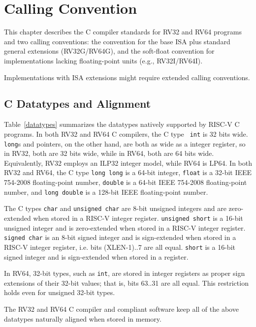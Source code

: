 \chapter{Calling Convention}
\label{sec:calling}

This chapter describes the C compiler standards for RV32 and RV64 programs
and two calling conventions: the convention for the base ISA
plus standard general extensions (RV32G/RV64G), and the soft-float
convention for implementations lacking floating-point units (e.g., RV32I/RV64I).

\begin{commentary}
Implementations with ISA extensions might require extended calling
conventions.
\end{commentary}

\section{C Datatypes and Alignment}

Table~\ref{datatypes} summarizes the datatypes natively supported by
RISC-V C programs.  In both RV32 and RV64 C compilers, the C type {\tt
  int} is 32 bits wide.  {\tt long}s and pointers, on the other hand,
are both as wide as a integer register, so in RV32, both are 32 bits
wide, while in RV64, both are 64 bits wide.  Equivalently, RV32
employs an ILP32 integer model, while RV64 is LP64.  In both RV32 and
RV64, the C type {\tt long long} is a 64-bit integer, {\tt float} is a
32-bit IEEE 754-2008 floating-point number, {\tt double} is a 64-bit
IEEE 754-2008 floating-point number, and {\tt long double} is a
128-bit IEEE floating-point number.

The C types {\tt char} and {\tt unsigned char} are 8-bit unsigned integers and
are zero-extended when stored in a RISC-V integer register. {\tt unsigned
short} is a 16-bit unsigned integer and is zero-extended when stored in
a RISC-V integer register.  {\tt signed char} is an 8-bit signed integer and
is sign-extended when stored in a RISC-V integer register, i.e. bits
(XLEN-1)..7 are all equal.  {\tt short} is a 16-bit signed integer and is
sign-extended when stored in a register.

In RV64, 32-bit types, such as {\tt int}, are stored in integer registers
as proper sign extensions of their 32-bit values; that is, bits 63..31 are all
equal.  This restriction holds even for unsigned 32-bit types.

The RV32 and RV64 C compiler and compliant software keep all of the
above datatypes naturally aligned when stored in memory.

